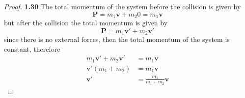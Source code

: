 \documentclass[11pt]{article}
\begin{document}
        \begin{proof}{\textbf{1.30}}
            The total momentum of the system before the collision is given by
            $$\bm{P} = m_1 \bm{v} + m_2 0 = m_1 \bm{v}$$
            but after the collision the total momentum is given by
            $$\bm{P} = m_1 \bm{v'} + m_2 \bm{v'}$$
            since there is no external forces, then the total momentum of the
            system is constant, therefore
            \begin{align*}
                m_1 \bm{v'} + m_2 \bm{v'} &= m_1 \bm{v}\\
                       \bm{v'}(m_1 + m_2) &= m_1 \bm{v} \\
                                  \bm{v'} &= \frac{m_1}{m_1 + m_2}\bm{v}
            \end{align*}
        \end{proof}
\end{document}
